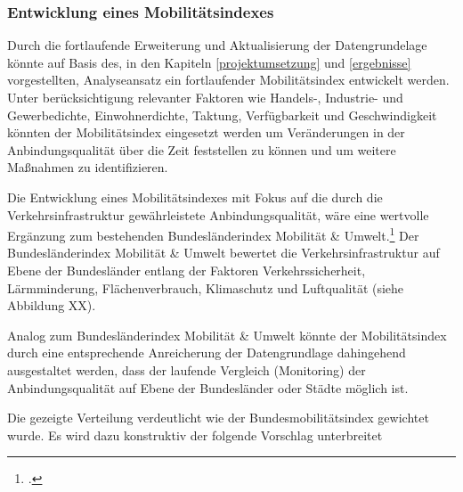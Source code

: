 
\subsubsection{Entwicklung eines Mobilitätsindexes}
Durch die fortlaufende Erweiterung und Aktualisierung der Datengrundelage könnte auf Basis des, in den Kapiteln \ref{projektumsetzung} und \ref{ergebnisse} vorgestellten, Analyseansatz ein fortlaufender Mobilitätsindex entwickelt werden. Unter berücksichtigung relevanter Faktoren wie Handels-, Industrie- und Gewerbedichte, Einwohnerdichte, Taktung, Verfügbarkeit und Geschwindigkeit könnten der Mobilitätsindex eingesetzt werden um Veränderungen in der Anbindungsqualität über die Zeit feststellen zu können und um weitere Maßnahmen zu identifizieren. 

Die Entwicklung eines Mobilitätsindexes mit Fokus auf die durch die Verkehrsinfrastruktur gewährleistete Anbindungsqualität, wäre eine wertvolle Ergänzung zum bestehenden Bundesländerindex Mobilität \& Umwelt.\footcite{Bundeslaenderindex:3} Der Bundesländerindex Mobilität \& Umwelt bewertet die Verkehrsinfrastruktur auf Ebene der Bundesländer entlang der Faktoren Verkehrssicherheit, Lärmminderung, Flächenverbrauch, Klimaschutz und Luftqualität (siehe Abbildung XX). 


Analog zum Bundesländerindex Mobilität \& Umwelt könnte der Mobilitätsindex durch eine entsprechende Anreicherung der Datengrundlage dahingehend ausgestaltet werden, dass der laufende Vergleich (Monitoring) der Anbindungsqualität auf Ebene der Bundesländer oder Städte möglich ist. 


Die gezeigte Verteilung verdeutlicht wie der Bundesmobilitätsindex gewichtet wurde. Es wird dazu konstruktiv der folgende Vorschlag unterbreitet





